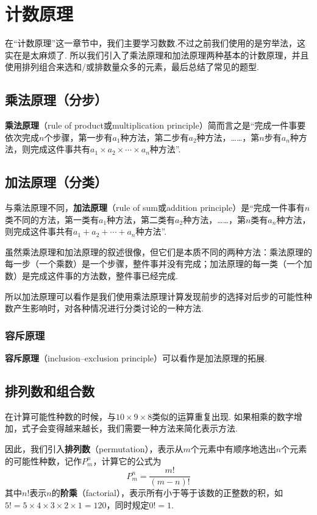 \chapter{计数原理}
在“计数原理”这一章节中，我们主要学习数数.不过之前我们使用的是穷举法，这实在是太麻烦了. 所以我们引入了乘法原理和加法原理两种基本的计数原理，并且使用排列组合来选和/或排数量众多的元素，最后总结了常见的题型.

\section[乘法原理]{乘法原理（分步）}
\textbf{乘法原理}（rule of product或multiplication principle）简而言之是“完成一件事要依次完成$n$个步骤，第一步有$a_1$种方法，第二步有$a_2$种方法，\ldots\ldots，第$n$步有$a_n$种方法，则完成这件事共有$a_1\times a_2 \times\cdots\times a_n$种方法”.

\section[加法原理]{加法原理（分类）}
与乘法原理不同，\textbf{加法原理}（rule of sum或addition principle）是“完成一件事有$n$类不同的方法，第一类有$a_1$种方法，第二类有$a_2$种方法，\ldots\ldots，第$n$类有$a_n$种方法，则完成这件事共有$a_1+a_2+\cdots+a_n$种方法”.

虽然乘法原理和加法原理的叙述很像，但它们是本质不同的两种方法：乘法原理的每一步（一个乘数）是一个步骤，整件事并没有完成；加法原理的每一类（一个加数）是完成这件事的方法数，整件事已经完成.

所以加法原理可以看作是我们使用乘法原理计算发现前步的选择对后步的可能性种数产生影响时，对各种情况进行分类讨论的一种方法.

\subsection{容斥原理}
\textbf{容斥原理}（inclusion–exclusion principle）可以看作是加法原理的拓展.

\section{排列数和组合数}
在计算可能性种数的时候，与$10\times 9\times 8$类似的运算重复出现. 如果相乘的数字增加，式子会变得越来越长，我们需要一种方法来简化表示方法.

因此，我们引入\textbf{排列数}（permutation），表示从$m$个元素中有顺序地选出$n$个元素的可能性种数，记作$P_m^n$，计算它的公式为\[P_m^n=\frac{m!}{(m-n)!}\]其中$n!$表示$n$的\textbf{阶乘}（factorial），表示所有小于等于该数的正整数的积，如$5!=5\times 4\times 3\times 2\times 1=120$，同时规定$0!=1$.

